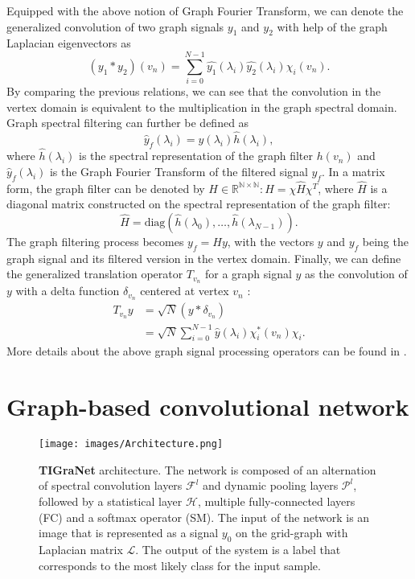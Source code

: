 \documentclass[10pt,journal,compsoc]{IEEEtran}
\begin{document}
	Equipped with the above notion of Graph Fourier Transform, we can denote the generalized convolution of two graph signals $y_1$ and $y_2$ with help of the graph Laplacian eigenvectors as
	\begin{equation}
	(y_1 * y_2)(v_n) = \sum_{i=0}^{N-1} \hat{y_1}(\lambda_i) \hat{y_2}(\lambda_i) \chi_i (v_n).
	\label{eq:conv}
	\end{equation}
	By comparing the previous relations, we can see that the convolution in the vertex domain is equivalent to the multiplication in the graph spectral domain. Graph spectral filtering can further be defined as
	\begin{equation}
	\hat{y}_f(\lambda_i) = \hat{y}(\lambda_i) \hat{h}(\lambda_i),
	\end{equation}
	where $\hat{h}(\lambda_i)$ is the spectral representation of the graph filter $h(v_n)$ and $\hat{y}_f(\lambda_i)$ is the Graph Fourier Transform of the filtered signal $y_f$. In a matrix form, the graph filter can be denoted by $H \in \mathbb{R^{N \times N}}: H=\chi \hat{H} \chi^T$, where $\hat{H}$ is a diagonal matrix constructed on the spectral representation of the graph filter:
	\begin{equation}
	\hat{H}=\mathrm{diag} (\hat{h}(\lambda_0), \dots, \hat{h}(\lambda_{N-1})).
	\label{eq:hatH}
	\end{equation}
	The graph filtering process becomes $y_f = H y $, with the vectors $y$ and $y_f$ being the graph signal and its filtered version in the vertex domain. Finally, we can define the generalized translation operator $T_{v_n}$ for a graph signal $y$ as the convolution of $y$ with a delta function $\delta_{v_n}$ centered at vertex $v_n$ \cite{bb:thanou2014learning}:
	\begin{equation}
	\begin{array}{rl}
	T_{v_n} y & = \sqrt{N}(y * \delta_{v_n}) \\
	& =\sqrt{N}\sum_{i=0}^{N-1}\hat{y}(\lambda_i)\chi_i^*(v_n)\chi_i .
	\end{array}
	\label{eq:transl}
	\end{equation}
	More details about the above graph signal processing operators can be found in \cite{bb:shuman2013emerging}.

	\section{Graph-based convolutional network}
	\label{s:overview}

	\begin{figure*}[tb!]
		\texttt{[image: images/Architecture.png]}
		\vspace{-1.0cm}
		\caption{{\bf TIGraNet} architecture. The network is composed of an alternation of spectral convolution layers $\mathcal{F}^{l}$  and dynamic pooling layers $\mathcal{P}^{l}$, followed by a statistical layer $\mathcal{H}$, multiple fully-connected layers (FC) and a softmax operator (SM). The input of the network is an image that is represented as a signal $y_0$ on the grid-graph with Laplacian matrix $\mathcal{L}$. The output of the system is a label that corresponds to the most likely class for the input sample.}
		\label{fig:architecture}
	\end{figure*}
\end{document}

